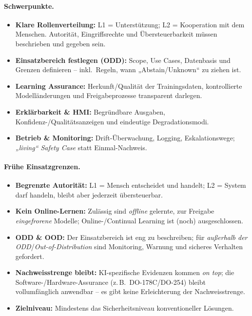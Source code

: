 \paragraph{Schwerpunkte.}
\begin{itemize}
  \item \textbf{Klare Rollenverteilung:} L1 = Unterstützung; L2 = Kooperation mit dem Menschen. Autorität, Eingriffsrechte und Übersteuerbarkeit müssen beschrieben und gegeben sein.
  \item \textbf{Einsatzbereich festlegen (ODD):} Scope, Use Cases, Datenbasis und Grenzen definieren – inkl.\ Regeln, wann „Abstain/Unknown“ zu ziehen ist.
  \item \textbf{Learning Assurance:} Herkunft/Qualität der Trainingsdaten, kontrollierte Modelländerungen und Freigabeprozesse transparent darlegen.
  \item \textbf{Erklärbarkeit \& HMI:} Begründbare Ausgaben, Konfidenz-/Qualitätsanzeigen und eindeutige Degradationsmodi.
  \item \textbf{Betrieb \& Monitoring:} Drift-Überwachung, Logging, Eskalationswege; \emph{„living“ Safety Case} statt Einmal-Nachweis.
\end{itemize}

\paragraph{Frühe Einsatzgrenzen.}
\begin{itemize}
  \item \textbf{Begrenzte Autorität:} L1 = Mensch entscheidet und handelt; L2 = System darf handeln, bleibt aber jederzeit übersteuerbar.
  \item \textbf{Kein Online-Lernen:} Zulässig sind \emph{offline} gelernte, zur Freigabe \emph{eingefrorene} Modelle; Online-/Continual Learning ist (noch) ausgeschlossen.
  \item \textbf{ODD \& OOD:} Der Einsatzbereich ist eng zu beschreiben; für \emph{außerhalb der ODD}/\emph{Out-of-Distribution} sind Monitoring, Warnung und sicheres Verhalten gefordert.
  \item \textbf{Nachweisstrenge bleibt:} KI-spezifische Evidenzen kommen \emph{on top}; die Software-/Hardware-Assurance (z.\,B.\ DO-178C/DO-254) bleibt vollumfänglich anwendbar – es gibt keine Erleichterung der Nachweisstrenge.
  \item \textbf{Zielniveau:} Mindestens das Sicherheitsniveau konventioneller Lösungen.
\end{itemize}





